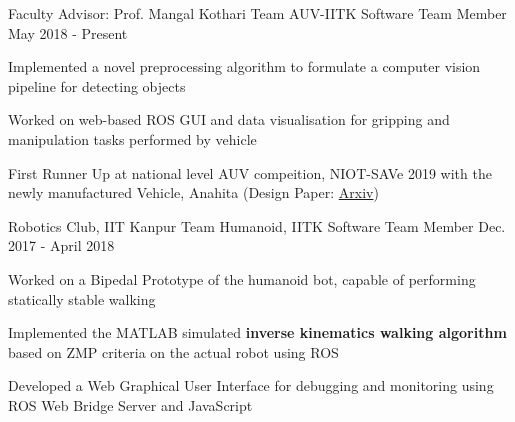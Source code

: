 
\begin{cventries}

  \cventry
    {Faculty Advisor: Prof. Mangal Kothari}
    {Team AUV-IITK}
    {Software Team Member}
    {May 2018 - Present}
    {
      \begin{cvitems}
        \item {Implemented a novel preprocessing algorithm to formulate a computer vision pipeline for detecting objects}
        \item {Worked on web-based ROS GUI and data visualisation for gripping and manipulation tasks performed by vehicle}
        \item {First Runner Up at national level AUV compeition, NIOT-SAVe 2019 with the newly manufactured Vehicle, Anahita (Design Paper: \href{https://arxiv.org/abs/1903.00494}{Arxiv})}
      \end{cvitems}
    }
  
  \cventry
    {Robotics Club, IIT Kanpur}
    {Team Humanoid, IITK}
    {Software Team Member}
    {Dec. 2017 - April 2018} 
    {
      \begin{cvitems} 
        \item {Worked on a Bipedal Prototype of the humanoid bot, capable of performing statically stable walking}
        \item {Implemented the MATLAB simulated \textbf{inverse kinematics walking algorithm} based on ZMP criteria on the actual robot using ROS}
        \item {Developed a Web Graphical User Interface for debugging and monitoring using ROS Web Bridge Server and JavaScript}
      \end{cvitems}
    }
\end{cventries}
